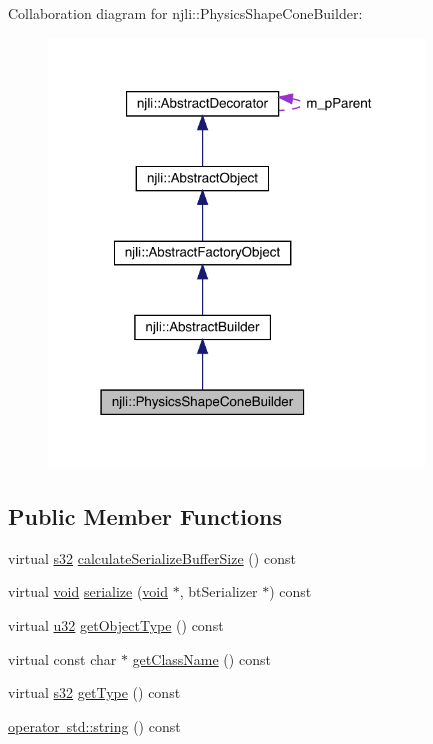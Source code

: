 Collaboration diagram for njli\+:\+:Physics\+Shape\+Cone\+Builder\+:\nopagebreak
\begin{figure}[H]
\begin{center}
\leavevmode
\includegraphics[width=283pt]{classnjli_1_1_physics_shape_cone_builder__coll__graph}
\end{center}
\end{figure}
\subsection*{Public Member Functions}
\begin{DoxyCompactItemize}
\item 
virtual \mbox{\hyperlink{_util_8h_aa62c75d314a0d1f37f79c4b73b2292e2}{s32}} \mbox{\hyperlink{classnjli_1_1_physics_shape_cone_builder_a5b98a951c00fe9b03c121d3e94b6e910}{calculate\+Serialize\+Buffer\+Size}} () const
\item 
virtual \mbox{\hyperlink{_thread_8h_af1e856da2e658414cb2456cb6f7ebc66}{void}} \mbox{\hyperlink{classnjli_1_1_physics_shape_cone_builder_a2a0376fd376d574255de19de5961acc0}{serialize}} (\mbox{\hyperlink{_thread_8h_af1e856da2e658414cb2456cb6f7ebc66}{void}} $\ast$, bt\+Serializer $\ast$) const
\item 
virtual \mbox{\hyperlink{_util_8h_a10e94b422ef0c20dcdec20d31a1f5049}{u32}} \mbox{\hyperlink{classnjli_1_1_physics_shape_cone_builder_afaf1daa40f05416842f5eb9f61e58608}{get\+Object\+Type}} () const
\item 
virtual const char $\ast$ \mbox{\hyperlink{classnjli_1_1_physics_shape_cone_builder_a68948fc1dd3683ea335c5bf6645dcc1a}{get\+Class\+Name}} () const
\item 
virtual \mbox{\hyperlink{_util_8h_aa62c75d314a0d1f37f79c4b73b2292e2}{s32}} \mbox{\hyperlink{classnjli_1_1_physics_shape_cone_builder_a11ff6199b06423247720ecf8585d69bc}{get\+Type}} () const
\item 
\mbox{\hyperlink{classnjli_1_1_physics_shape_cone_builder_a30e60c72c505f1945b25990affe53aa5}{operator std\+::string}} () const
\end{DoxyCompactItemize}
